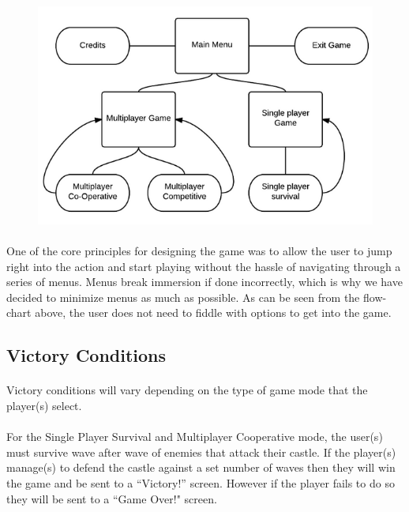 \begin{figure}[H]
	\centering
	\includegraphics{../images/castle-defense-game-flow.png}
\end{figure}

\paragraph{} One of the core principles for designing the game was to allow the user to jump right into the action and start playing without the hassle of navigating through a series of menus. Menus break immersion if done incorrectly, which is why we have decided to minimize menus as much as possible. As can be seen from the flow-chart above, the user does not need to fiddle with options to get into the game. 

\subsection{Victory Conditions}

\paragraph{} Victory conditions will vary depending on the type of game mode that the player(s) select. 

\paragraph{} For the Single Player Survival and Multiplayer Cooperative mode, the user(s) must survive wave after wave of enemies that attack their castle. If the player(s) manage(s) to defend the castle against a set number of waves then they will win the game and be sent to a “Victory!” screen. However if the player fails to do so they will be sent to a ``Game Over!" screen.

